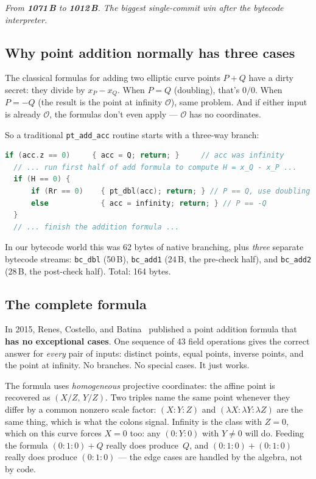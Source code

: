 \documentclass[11pt,a4paper]{article}
\newcommand{\bytes}[1]{\textcolor{blue!60!black}{\textbf{#1\,B}}}
\begin{document}
\noindent\emph{From \bytes{1071} to \bytes{1012}. The biggest
single-commit win after the bytecode interpreter.}

\subsection{Why point addition normally has three cases}

The classical formulas for adding two elliptic curve points $P + Q$
have a dirty secret: they divide by $x_P - x_Q$. When $P = Q$
(doubling), that's $0/0$. When $P = -Q$ (the result is the point at
infinity $\mathcal{O}$), same problem. And if either input is already
$\mathcal{O}$, the formulas don't even apply --- $\mathcal{O}$ has no
coordinates.

So a traditional \texttt{pt\_add\_acc} routine starts with a
three-way branch:
\begin{lstlisting}[language=C]
  if (acc.z == 0)     { acc = Q; return; }     // acc was infinity
  // ... run first half of add formula to compute H = x_Q - x_P ...
  if (H == 0) {
      if (Rr == 0)    { pt_dbl(acc); return; } // P == Q, use doubling
      else            { acc = infinity; return; } // P == -Q
  }
  // ... finish the addition formula ...
\end{lstlisting}
In our bytecode world this was 62 bytes of native branching, plus
\emph{three} separate bytecode streams: \texttt{bc\_dbl} (50\,B),
\texttt{bc\_add1} (24\,B, the pre-check half), and \texttt{bc\_add2}
(28\,B, the post-check half). Total: 164 bytes.

\subsection{The complete formula}

In 2015, Renes, Costello, and Batina~\cite{rcb} published a point
addition formula that \textbf{has no exceptional cases}. One sequence
of 43 field operations gives the correct answer for \emph{every} pair
of inputs: distinct points, equal points, inverse points, and the
point at infinity. No branches. No special cases. It just works.

The formula uses \emph{homogeneous} projective coordinates: the
affine point is recovered as $(X/Z,\, Y/Z)$. Two triples name the
same point
whenever they differ by a common nonzero scale factor: $(X:Y:Z)$ and
$(\lambda X:\lambda Y:\lambda Z)$ are the same thing, which is what
the colons signal. Infinity is
the class with $Z = 0$, which on this curve forces $X = 0$ too: any
$(0:Y:0)$ with $Y \neq 0$ will do. Feeding the formula $(0:1:0) + Q$
really does produce~$Q$, and $(0:1:0) + (0:1:0)$ really does produce
$(0:1:0)$ --- the edge cases are handled by the algebra, not by code.
\end{document}
